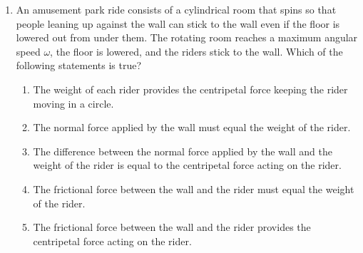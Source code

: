 \documentclass{../../../oss-classkick}
\begin{document}
\begin{multicols*}{2}
\begin{enumerate}[leftmargin=18pt,resume]
\begin{enumerate}[nosep,leftmargin=18pt,label=(\Alph*)]
    \item{}
     
   \item{}
    \end{enumerate}
    \columnbreak
    
  \item An amusement park ride consists of a cylindrical room that spins so
    that people leaning up against the wall can stick to the wall even if the
    floor is lowered out from under them. The rotating room reaches a maximum
    angular speed $\omega$, the floor is lowered, and the riders stick to
    the wall. Which of the following statements is true?
    \begin{enumerate}[nosep,leftmargin=18pt,label=(\Alph*)]
    \item The weight of each rider provides the centripetal force keeping the
      rider moving in a circle.
    \item The normal force applied by the wall must equal the weight of the
      rider.
    \item  The difference between the normal force applied by the wall and the
      weight of the rider is equal to the centripetal force acting on the rider.
    \item  The frictional force between the wall and the rider must equal the
      weight of the rider.
    \item  The frictional force between the wall and the rider provides the
      centripetal force acting on the rider.
    \end{enumerate}
  \end{enumerate}
  \vspace{.7in}
  

\end{multicols*}
\end{document}
